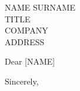 \documentclass[a4paper, 12pt]{letter}
\begin{document}
\begin{letter}{
    NAME SURNAME \\
    TITLE\\
    COMPANY\\
    ADDRESS\\
    }

\opening{Dear [NAME]}

\closing{Sincerely,}
\end{letter}
\end{document}
